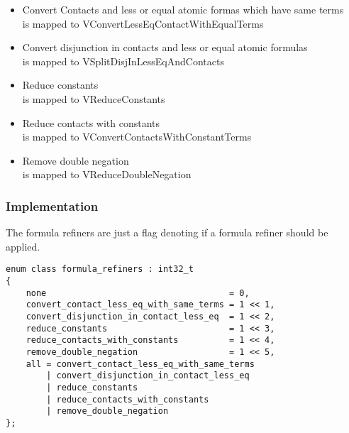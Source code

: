 \documentclass{article}
\begin{document}
			\begin{itemize}
				\item Convert Contacts and less or equal atomic formas which have same terms \\
					 is mapped to VConvertLessEqContactWithEqualTerms
				\item Convert disjunction in contacts and less or equal atomic formulas \\
					 is mapped to VSplitDisjInLessEqAndContacts
				\item Reduce constants \\
					 is mapped to VReduceConstants
				\item Reduce contacts with constants \\
					 is mapped to VConvertContactsWithConstantTerms
				\item Remove double negation \\
					 is mapped to VReduceDoubleNegation
			\end{itemize}
						
		\subsubsection*{Implementation}
			The formula refiners are just a flag denoting if a formula refiner should be applied.
			\begin{lstlisting}
enum class formula_refiners : int32_t
{
    none                                    = 0,
    convert_contact_less_eq_with_same_terms = 1 << 1,
    convert_disjunction_in_contact_less_eq  = 1 << 2,
    reduce_constants                        = 1 << 3,
    reduce_contacts_with_constants          = 1 << 4,
    remove_double_negation                  = 1 << 5,
    all = convert_contact_less_eq_with_same_terms
        | convert_disjunction_in_contact_less_eq 
        | reduce_constants 
        | reduce_contacts_with_constants 
        | remove_double_negation
};
			\end{lstlisting}
\end{document}
